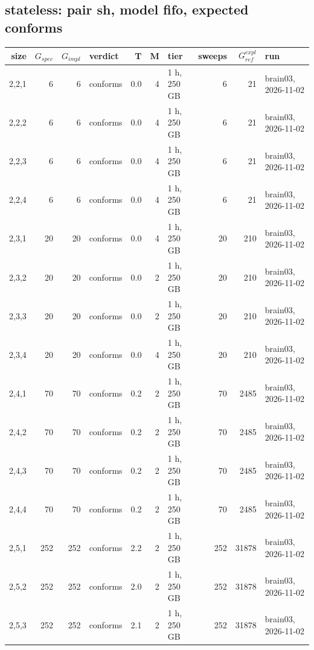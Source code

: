 \documentclass[10pt]{article}
\begin{document}
\subsection*{stateless: pair \textsf{sh}, model fifo, expected conforms}
\begin{longtable}{@{}rrrlrrlrrl@{}}
\toprule
size & $G_{\mathit{spec}}$ & $G_{\mathit{impl}}$ & verdict & T & M & tier & sweeps & $G_{\mathit{ref}}^{\mathit{expl}}$ & run \\
\midrule
\endhead
\color{blue} 2,2,1 & 6 & 6 & conforms & 0.0 & 4 & 1 h, 250 GB & 6 & 21 & brain03, 2026-11-02 \\
\color{blue} 2,2,2 & 6 & 6 & conforms & 0.0 & 4 & 1 h, 250 GB & 6 & 21 & brain03, 2026-11-02 \\
\color{blue} 2,2,3 & 6 & 6 & conforms & 0.0 & 4 & 1 h, 250 GB & 6 & 21 & brain03, 2026-11-02 \\
\color{blue} 2,2,4 & 6 & 6 & conforms & 0.0 & 4 & 1 h, 250 GB & 6 & 21 & brain03, 2026-11-02 \\
\color{blue} 2,3,1 & 20 & 20 & conforms & 0.0 & 4 & 1 h, 250 GB & 20 & 210 & brain03, 2026-11-02 \\
\color{blue} 2,3,2 & 20 & 20 & conforms & 0.0 & 2 & 1 h, 250 GB & 20 & 210 & brain03, 2026-11-02 \\
\color{blue} 2,3,3 & 20 & 20 & conforms & 0.0 & 2 & 1 h, 250 GB & 20 & 210 & brain03, 2026-11-02 \\
\color{blue} 2,3,4 & 20 & 20 & conforms & 0.0 & 4 & 1 h, 250 GB & 20 & 210 & brain03, 2026-11-02 \\
\color{blue} 2,4,1 & 70 & 70 & conforms & 0.2 & 2 & 1 h, 250 GB & 70 & 2485 & brain03, 2026-11-02 \\
\color{blue} 2,4,2 & 70 & 70 & conforms & 0.2 & 2 & 1 h, 250 GB & 70 & 2485 & brain03, 2026-11-02 \\
\color{blue} 2,4,3 & 70 & 70 & conforms & 0.2 & 2 & 1 h, 250 GB & 70 & 2485 & brain03, 2026-11-02 \\
\color{blue} 2,4,4 & 70 & 70 & conforms & 0.2 & 2 & 1 h, 250 GB & 70 & 2485 & brain03, 2026-11-02 \\
\color{blue} 2,5,1 & 252 & 252 & conforms & 2.2 & 2 & 1 h, 250 GB & 252 & 31878 & brain03, 2026-11-02 \\
\color{blue} 2,5,2 & 252 & 252 & conforms & 2.0 & 2 & 1 h, 250 GB & 252 & 31878 & brain03, 2026-11-02 \\
\color{blue} 2,5,3 & 252 & 252 & conforms & 2.1 & 2 & 1 h, 250 GB & 252 & 31878 & brain03, 2026-11-02 \\

\end{longtable}
\end{document}
